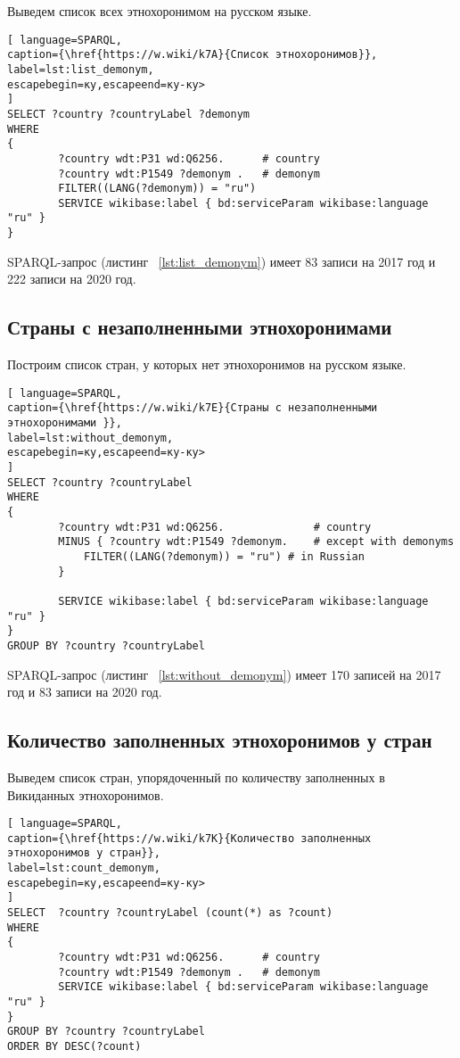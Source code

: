 Выведем список всех этнохоронимом на русском языке.

\begin{lstlisting}[ language=SPARQL, 
caption={\href{https://w.wiki/k7A}{Cписок этнохоронимов}},
label=lst:list_demonym, 
escapebegin=ку,escapeend=ку-ку>
]
SELECT ?country ?countryLabel ?demonym
WHERE
{
		?country wdt:P31 wd:Q6256.      # country
		?country wdt:P1549 ?demonym .   # demonym
		FILTER((LANG(?demonym)) = "ru")
		SERVICE wikibase:label { bd:serviceParam wikibase:language "ru" }
}
\end{lstlisting}

SPARQL-запрос  (листинг ~\ref{lst:list_demonym}) имеет 83 записи на 2017 год и 222 записи на 2020 год.

\subsection{Страны с незаполненными этнохоронимами}

Построим список стран, у которых нет этнохоронимов на русском языке.

\begin{lstlisting}[ language=SPARQL, 
caption={\href{https://w.wiki/k7E}{Страны с незаполненными этнохоронимами }},
label=lst:without_demonym, 
escapebegin=ку,escapeend=ку-ку>
]
SELECT ?country ?countryLabel 
WHERE
{
		?country wdt:P31 wd:Q6256.              # country
		MINUS { ?country wdt:P1549 ?demonym.    # except with demonyms
			FILTER((LANG(?demonym)) = "ru") # in Russian
		}    

		SERVICE wikibase:label { bd:serviceParam wikibase:language "ru" }
}
GROUP BY ?country ?countryLabel
\end{lstlisting}

SPARQL-запрос  (листинг ~\ref{lst:without_demonym}) имеет 170 записей на 2017 год и 83 записи на 2020 год.

\subsection{Количество заполненных этнохоронимов у стран}

Выведем список стран, упорядоченный по количеству заполненных в Викиданных этнохоронимов.

\begin{lstlisting}[ language=SPARQL, 
caption={\href{https://w.wiki/k7K}{Количество заполненных этнохоронимов у стран}},
label=lst:count_demonym, 
escapebegin=ку,escapeend=ку-ку>
]
SELECT  ?country ?countryLabel (count(*) as ?count)
WHERE
{
		?country wdt:P31 wd:Q6256.      # country
		?country wdt:P1549 ?demonym .   # demonym
		SERVICE wikibase:label { bd:serviceParam wikibase:language "ru" }
}
GROUP BY ?country ?countryLabel 
ORDER BY DESC(?count)
\end{lstlisting}

